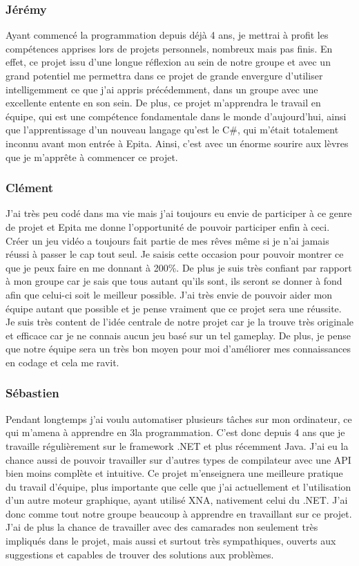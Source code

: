 ﻿\documentclass[12pt]{article}
\begin{document}
\subsubsection{Jérémy }
Ayant commencé la programmation depuis déjà 4 ans, je mettrai à profit les compétences
apprises lors de projets personnels, nombreux mais pas finis. En effet, ce projet issu
d'une longue réflexion au sein de notre groupe et avec un grand potentiel me permettra
dans ce projet de grande envergure d'utiliser intelligemment ce que j'ai appris précédemment,
dans un groupe avec une excellente entente en son sein. De plus, ce projet m'apprendra
le travail en équipe, qui est une compétence fondamentale dans le monde d'aujourd'hui,
ainsi que l'apprentissage d'un nouveau langage qu'est le C\#, qui m'était totalement
inconnu avant mon entrée à Epita. Ainsi, c'est avec un énorme sourire aux lèvres que
je m'apprête à commencer ce projet. 

\subsubsection{Clément }
J'ai très peu codé dans ma vie mais j'ai toujours eu envie de participer à ce genre de
projet et Epita me donne l'opportunité de pouvoir participer enfin à ceci. Créer un jeu
vidéo a toujours fait partie de mes rêves même si je n'ai jamais réussi à passer le cap
tout seul. Je saisis cette occasion pour pouvoir montrer ce que je peux faire en me
donnant à 200\%. De plus je suis très confiant par rapport à mon groupe car je sais
que tous autant qu'ils sont, ils seront se donner à fond afin que celui-ci soit le
meilleur possible. J'ai très envie de pouvoir aider mon équipe autant que possible et
je pense vraiment que ce projet sera une réussite. Je suis très content de l'idée
centrale de notre projet car je la trouve très originale et efficace car je ne connais
aucun jeu basé sur un tel gameplay. De plus, je pense que notre équipe sera un très 
bon moyen pour moi d'améliorer mes connaissances en codage et cela me ravit. 

\subsubsection{Sébastien }
Pendant longtemps j'ai voulu automatiser plusieurs tâches sur mon ordinateur, ce qui
m'amena à apprendre en 3\ieme la programmation. C'est donc depuis 4 ans que je travaille
régulièrement sur le framework .NET et plus récemment Java. J'ai eu la chance aussi de
pouvoir travailler sur d'autres types de compilateur avec une API bien moins complète
et intuitive. Ce projet m'enseignera une meilleure pratique du travail d'équipe, plus
importante que celle que j'ai actuellement et l'utilisation d'un autre moteur graphique,
ayant utilisé XNA, nativement celui du .NET. J'ai donc comme tout notre groupe beaucoup
à apprendre en travaillant sur ce projet. J'ai de plus la chance de travailler avec des
camarades non seulement très impliqués dans le projet, mais aussi et surtout très sympathiques,
ouverts aux suggestions et capables de trouver des solutions aux problèmes.
\end{document}
